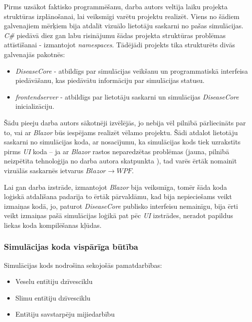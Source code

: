 Pirms uzsākot faktisko programmēšanu, darba autors veltīja laiku projekta
struktūras izplānošanai, lai veiksmīgi varētu projektu realizēt. Viens no šādiem
galvenajiem mērķiem bija atdalīt vizuālo lietotāju saskarni no pašas simulācijas.
\emph{C\#} piedāvā diez gan labu risinājumu šādas projekta struktūras problēmas
attīstīšanai - izmantojot
\emph{namespaces}\cite{csharp:namespaces}. Tādējādi projekts tika strukturēts
divās galvenajās pakotnēs:

\begin{itemize}
    \item \emph{DiseaseCore} - atbildīgs par simulācijas veikšanu un programmatiskā
        interfeisa piedāvāšanu, kas piedāvātu informāciju par simulācijas statusu.
    \item \emph{frontendserver} - atbildīgs par lietotāju saskarni un simulācijas
        \emph{DiseaseCore} inicializāciju.
\end{itemize}

Šādu pieeju darba autors sākotnēji izvēlējās, jo nebija vēl pilnībā pārliecināts
par to, vai ar \emph{Blazor} būs iespējams realizēt vēlamo projektu. Šādi atdalot
lietotāju saskarni no simulācijas koda, ar nosacījumu, ka simulācijas kods tiek
uzrakstīts pirms \emph{UI} koda -- ja ar \emph{Blazor} rastos neparedzētas problēmas
(jauna, pilnībā neizpētīta tehnoloģija no darba autora skatpunkta ), tad varēs ērtāk
nomainīt vizuālās saskarnēs ietvarus \(Blazor \rightarrow WPF\).

Lai gan darba izstrāde, izmantojot \emph{Blazor} bija veiksmīga, tomēr šāda koda loģiskā
atdalīšana padarīja to ērtāk
pārvaldāmu, kad bija nepieciešams veikt izmaiņas kodā, jo, paturot \emph{DiseaseCore}
publisko interfeisu nemainīgu, bija ērti veikt izmaiņas pašā simulācijas loģikā
pat pēc \emph{UI} izstrādes, neradot papildus liekas koda kompilēšanas kļūdas.

\subsubsection*{Simulācijas koda vispārīga būtība}

Simulācijas kods nodrošina sekojošās pamatdarbības:

\begin{itemize}
    \item Veselu entītiju dzīvesciklu
    \item Slimu entītiju dzīvesciklu
    \item Entītiju savstarpēju mijiedarbību
\end{itemize}

